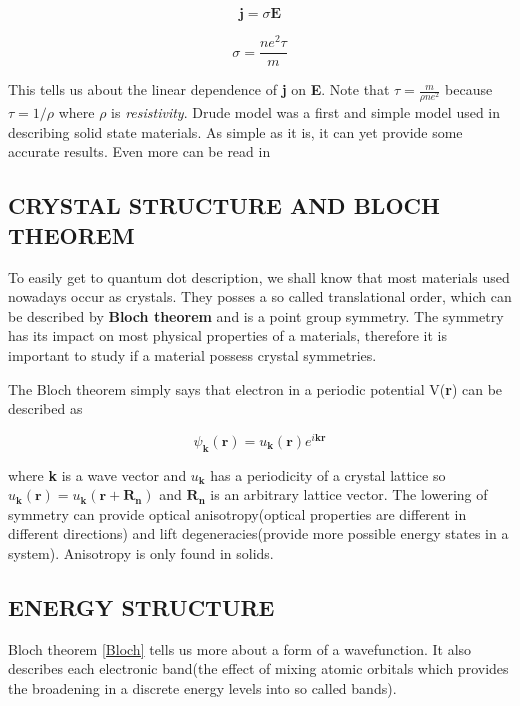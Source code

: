 \begin{equation}
\mathbf{j}=\sigma\mathbf{E}
\end{equation}

\begin{equation}
\sigma=\frac{ne^2\tau}{m}
\end{equation}

This tells us about the linear dependence of \textbf{j} on \textbf{E}. Note that $\tau = \frac{m}{\rho n e^{2}}$ because $\tau = 1/\rho$ where $\rho$ is \textit{resistivity}.
Drude model was a first and simple model used in describing solid state materials. As simple as it is, it can yet provide some accurate results. Even more can be read in \cite{Aschcroft}


\subsection{CRYSTAL STRUCTURE AND BLOCH THEOREM}

To easily get to quantum dot description, we shall know that most materials used nowadays occur as crystals. They posses a so called translational order, which can be described by \textbf{Bloch theorem} and is a point group symmetry. The symmetry has its impact on most physical properties of a materials, therefore it is important to study if a material possess crystal symmetries. 

The Bloch theorem simply says that electron in a periodic potential V(\textbf{r}) can be described as 

\begin{equation}
\psi _\mathbf{k} (\mathbf{r}) = u_\mathbf{k}(\mathbf{r})e^{i\mathbf{k}\mathbf{r}}
\label{Bloch}
\end{equation}

where \textbf{k} is a wave vector and $u_\mathbf{k}$ has a periodicity of a crystal lattice so $u_\mathbf{k}(\mathbf{r}) = u_\mathbf{k}(\mathbf{r+R_n})$ and $\mathbf{R_n}$ is an arbitrary lattice vector.
The lowering of symmetry can provide optical anisotropy(optical properties are different in different directions) and lift degeneracies(provide more possible energy states in a system). Anisotropy is only found in solids.

\subsection{ENERGY STRUCTURE}
Bloch theorem \ref{Bloch} tells us more about a form of a wavefunction. It also describes each electronic band(the effect of mixing atomic orbitals which provides the broadening in a discrete energy levels into so called bands). 

